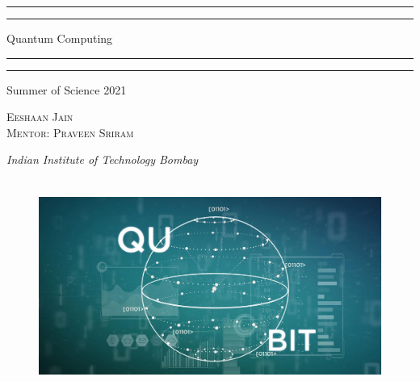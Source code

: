 \documentclass{package/notes}
\newcommand{\0}{\ket{0}}
\newcommand{\1}{\ket{1}}
\begin{document}
\begin{titlepage}


\centering %
		
\scshape %

\vspace*{\baselineskip} %


\rule{\textwidth}{1.6pt}\vspace*{-\baselineskip}\vspace*{2pt} %
\rule{\textwidth}{0.4pt} %

\vspace{0.75\baselineskip} %
{\huge { Quantum Computing }\\} %

\vspace{0.75\baselineskip} %

\rule{\textwidth}{0.4pt}\vspace*{-\baselineskip}\vspace{3.2pt} %
\rule{\textwidth}{1.6pt} %

\vspace{2\baselineskip} %

\LARGE{Summer of Science 2021} 

\vspace*{3\baselineskip} %



\vspace{0.5\baselineskip} 

{\scshape   \LARGE Eeshaan Jain\\ Mentor: Praveen Sriram} %

\vspace{0.2\baselineskip} 

\textit{\Large Indian Institute of Technology Bombay} 

\vfill 

\begin{figure}[!h]
    \centering
    \includegraphics[width=13cm, height=7cm]{resources/quantum-computing-qubit.jpg}
\end{figure}
\vspace{0.3\baselineskip} 



\end{titlepage}
\end{document}
